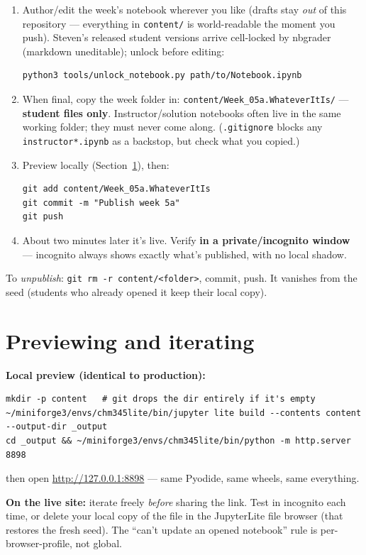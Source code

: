 \documentclass[11pt]{article}
\newcommand{\code}[1]{\texttt{\small #1}}
\begin{document}
\begin{enumerate}[itemsep=2pt]
  \item Author/edit the week's notebook wherever you like (drafts stay
    \emph{out} of this repository --- everything in \code{content/} is
    world-readable the moment you push). Steven's released student versions
    arrive cell-locked by nbgrader (markdown uneditable); unlock before
    editing:
\begin{lstlisting}
python3 tools/unlock_notebook.py path/to/Notebook.ipynb
\end{lstlisting}
  \item When final, copy the week folder in:
    \code{content/Week\_05a.WhateverItIs/} --- \textbf{student files only}.
    Instructor/solution notebooks often live in the same working folder; they
    must never come along. (\code{.gitignore} blocks any
    \code{*instructor*.ipynb} as a backstop, but check what you copied.)
  \item Preview locally (Section~\ref{sec:preview}), then:
\begin{lstlisting}
git add content/Week_05a.WhateverItIs
git commit -m "Publish week 5a"
git push
\end{lstlisting}
  \item About two minutes later it's live. Verify \textbf{in a private/incognito
    window} --- incognito always shows exactly what's published, with no local
    shadow.
\end{enumerate}

To \emph{unpublish}: \code{git rm -r content/<folder>}, commit, push. It
vanishes from the seed (students who already opened it keep their local copy).

\section{Previewing and iterating}\label{sec:preview}

\textbf{Local preview (identical to production):}
\begin{lstlisting}
mkdir -p content   # git drops the dir entirely if it's empty
~/miniforge3/envs/chm345lite/bin/jupyter lite build --contents content --output-dir _output
cd _output && ~/miniforge3/envs/chm345lite/bin/python -m http.server 8898
\end{lstlisting}
then open \url{http://127.0.0.1:8898} --- same Pyodide, same wheels, same
everything.

\textbf{On the live site:} iterate freely \emph{before} sharing the link. Test
in incognito each time, or delete your local copy of the file in the
JupyterLite file browser (that restores the fresh seed). The ``can't update an
opened notebook'' rule is per-browser-profile, not global.
\end{document}
